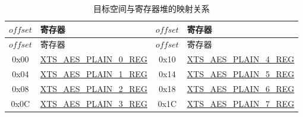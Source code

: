 \begin{longtable}[c]
{ |c|p{4.5cm} |c|p{4.5cm}|}
\caption{目标空间与寄存器堆的映射关系} 
\label{tab:extmemencr-data-padding}\\
\hline 
\rowcolor{lightgray}
\begin{math} offset \end{math}&  寄存器  & \begin{math} offset \end{math} &  寄存器 \\\hline
\endfirsthead
\hline
\rowcolor{lightgray}
\begin{math} offset \end{math} &  寄存器  & \begin{math} offset \end{math} &  寄存器   \\\hline
\endhead
\endfoot
0x00 & \hyperref[regdesc:XTSAESPLAINNREG]{XTS\_AES\_PLAIN\_0\_REG} & 0x10 & \hyperref[regdesc:XTSAESPLAINNREG]{XTS\_AES\_PLAIN\_4\_REG} \\\hline 
0x04 & \hyperref[regdesc:XTSAESPLAINNREG]{XTS\_AES\_PLAIN\_1\_REG} & 0x14 & \hyperref[regdesc:XTSAESPLAINNREG]{XTS\_AES\_PLAIN\_5\_REG} \\\hline 
0x08 & \hyperref[regdesc:XTSAESPLAINNREG]{XTS\_AES\_PLAIN\_2\_REG} & 0x18 & \hyperref[regdesc:XTSAESPLAINNREG]{XTS\_AES\_PLAIN\_6\_REG} \\\hline 
0x0C & \hyperref[regdesc:XTSAESPLAINNREG]{XTS\_AES\_PLAIN\_3\_REG} & 0x1C & \hyperref[regdesc:XTSAESPLAINNREG]{XTS\_AES\_PLAIN\_7\_REG} \\\hline 
\end{longtable}
